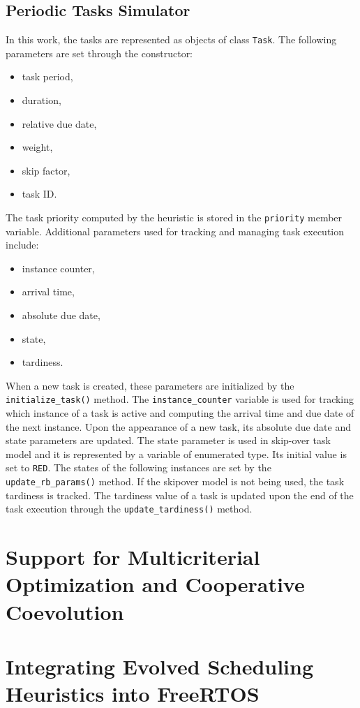 \subsection{Periodic Tasks Simulator}
In this work, the tasks are represented as objects of class \texttt{Task}.
The following parameters are set through the constructor:
\begin{itemize}
	\item task period,
	\item duration,
	\item relative due date,
	\item weight,
	\item skip factor,
	\item task ID.
\end{itemize}
The task priority computed by the heuristic is stored in the \texttt{priority} member variable.
Additional parameters used for tracking and managing task execution include:
\begin{itemize}
	\item instance counter,
	\item arrival time,
	\item absolute due date,
	\item state,
	\item tardiness.
\end{itemize}
When a new task is created, these parameters are initialized by the \texttt{initialize\_task()} method.
The \texttt{instance\_counter} variable is used for tracking which instance of a task is active and computing the arrival time and due date of the next instance.
Upon the appearance of a new task, its absolute due date and state parameters are updated.
The state parameter is used in skip-over task model and it is represented by a variable of enumerated type. Its initial value is set to \texttt{RED}.
The states of the following instances are set by the \texttt{update\_rb\_params()} method.
If the skipover model is not being used, the task tardiness is tracked.
The tardiness value of a task is updated upon the end of the task execution through the \texttt{update\_tardiness()} method.

\section{Support for Multicriterial Optimization and Cooperative Coevolution}
\section{Integrating Evolved Scheduling Heuristics into FreeRTOS}
